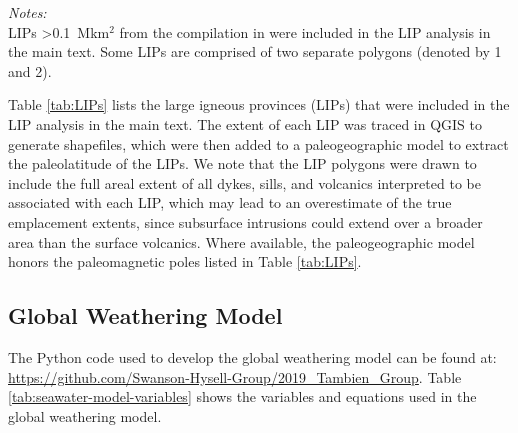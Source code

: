 \begin{table}
	\flushleft \emph{Notes:} \\
    LIPs \textgreater0.1~Mkm$^{2}$ from the compilation in \citep{Ernst2008a} were included in the LIP analysis in the main text. Some LIPs are comprised of two separate polygons (denoted by 1 and 2).
	\label{tab:LIPs}
\end{table}

Table \ref{tab:LIPs} lists the large igneous provinces (LIPs) that were included in the LIP analysis in the main text. The extent of each LIP was traced in QGIS to generate shapefiles, which were then added to a paleogeographic model \citep{Swanson-Hysell2019a} to extract the paleolatitude of the LIPs. We note that the LIP polygons were drawn to include the full areal extent of all dykes, sills, and volcanics interpreted to be associated with each LIP, which may lead to an overestimate of the true emplacement extents, since subsurface intrusions could extend over a broader area than the surface volcanics. Where available, the paleogeographic model honors the paleomagnetic poles listed in Table \ref{tab:LIPs}.

\subsection{Global Weathering Model}

The Python code used to develop the global weathering model can be found at: \url{https://github.com/Swanson-Hysell-Group/2019_Tambien_Group}. Table \ref{tab:seawater-model-variables} shows the variables and equations used in the global weathering model.

